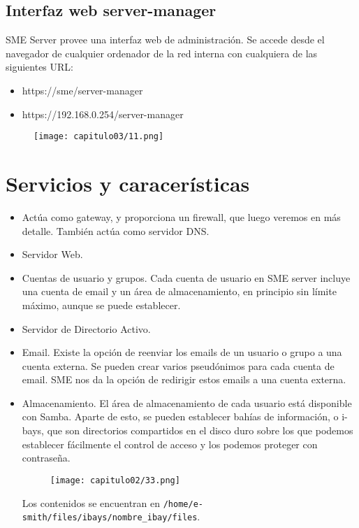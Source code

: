 \subsection{Interfaz web server-manager}

SME Server provee una interfaz web de administración. Se accede desde el navegador de cualquier ordenador de la red interna con cualquiera de las siguientes URL:

\begin{itemize}
  \item https://sme/server-manager
  \item https://192.168.0.254/server-manager
\end{itemize}

\begin{figure}[H]
    \centering
    \texttt{[image: capitulo03/11.png]}
\end{figure}

\section{Servicios y caracerísticas}

\begin{itemize}
\item Actúa como gateway, y proporciona un firewall, que luego veremos en más detalle. También actúa como servidor DNS.
\item Servidor Web.
\item Cuentas de usuario y grupos. Cada cuenta de usuario en SME server incluye una cuenta de email y un área de almacenamiento, en principio sin límite máximo, aunque se puede establecer.
\item Servidor de Directorio Activo.
\item Email. Existe la opción de reenviar los emails de un usuario o grupo a una cuenta externa. Se pueden crear varios pseudónimos para cada cuenta de email. SME nos da la opción de redirigir estos emails a una cuenta externa.
\item Almacenamiento. El área de almacenamiento de cada usuario está disponible con Samba. Aparte de esto, se pueden establecer bahías de información, o i-bays, que son directorios compartidos en el disco duro sobre los que podemos establecer fácilmente el control de acceso y los podemos proteger con contraseña.

\begin{figure}[H]
    \centering
    \texttt{[image: capitulo02/33.png]}
\end{figure}

Los contenidos se encuentran en \lstinline!/home/e-smith/files/ibays/nombre_ibay/files!.
\end{itemize}
